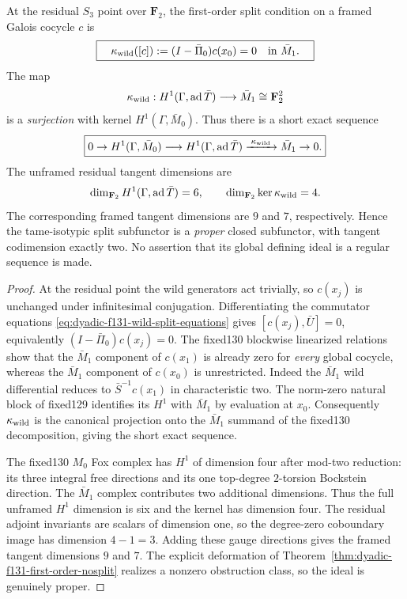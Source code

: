 \begin{corollary}
\label{cor:dyadic-f131-split-tangent-codimension}
At the residual $S_3$
point over $\mathbf F_2$,
the first-order split
condition on a framed
Galois cocycle $c$ is
\begin{equation}\label{eq:dyadic-f131-tangent-wild-character}
\boxed{\quad
\kappa_{\rm wild}([c])
:=(I-\bar\Pi_0)c(x_0)=0
\quad\text{in }\bar M_1.
\quad}
\end{equation}
The map
\[
\kappa_{\rm wild}:
H^1(\Gamma,\operatorname{ad}\bar T)
\longrightarrow\bar M_1
\cong\mathbf F_2^2
\]
is a \emph{surjection}
with kernel
$H^1(\Gamma,\bar M_0)$.
Thus there is a short
exact sequence
\begin{equation}\label{eq:dyadic-f131-tangent-exact-sequence}
\boxed{
0\to H^1(\Gamma,\bar M_0)
\longrightarrow
H^1(\Gamma,\operatorname{ad}\bar T)
\xrightarrow{\;\kappa_{\rm wild}\;}
\bar M_1\to0.
}
\end{equation}
The unframed residual
tangent dimensions are
\[
\dim_{\mathbf F_2}H^1(\Gamma,\operatorname{ad}\bar T)=6,
\qquad
\dim_{\mathbf F_2}\ker\kappa_{\rm wild}=4.
\]
The corresponding framed
tangent dimensions are
$9$ and $7$, respectively.
Hence the tame-isotypic
split subfunctor is a
\emph{proper} closed
subfunctor, with tangent
codimension exactly two.
No assertion that its
global defining ideal is
a regular sequence is made.
\end{corollary}

\begin{proof}
At the residual point
the wild generators
act trivially, so
$c(x_j)$ is unchanged
under infinitesimal
conjugation.
Differentiating the
commutator equations
\eqref{eq:dyadic-f131-wild-split-equations}
gives
$[c(x_j),\bar U]=0$,
equivalently
$(I-\bar\Pi_0)c(x_j)=0$.
The fixed130 blockwise
linearized relations show
that the $\bar M_1$
component of $c(x_1)$
is already zero for
\emph{every} global
cocycle, whereas the
$\bar M_1$ component of
$c(x_0)$ is unrestricted.
Indeed the $\bar M_1$
wild differential reduces
to $\bar S^{-1}c(x_1)$
in characteristic two.
The norm-zero natural
block of fixed129
identifies its $H^1$
with $\bar M_1$ by
evaluation at $x_0$.
Consequently
$\kappa_{\rm wild}$
is the canonical
projection onto the
$\bar M_1$ summand of
the fixed130
decomposition, giving
the short exact
sequence.

The fixed130 $M_0$
Fox complex has
$H^1$ of dimension
four after mod-two
reduction: its three
integral free directions
and its one top-degree
$2$-torsion Bockstein
direction.
The $\bar M_1$
complex contributes two
additional dimensions.
Thus the full unframed
$H^1$ dimension is six
and the kernel has
dimension four.
The residual adjoint
invariants are scalars
of dimension one, so
the degree-zero
coboundary image has
dimension $4-1=3$.
Adding these gauge
directions gives the
framed tangent
dimensions $9$ and $7$.
The explicit deformation
of
Theorem~\ref{thm:dyadic-f131-first-order-nosplit}
realizes a nonzero
obstruction class, so
the ideal is genuinely
proper.
\end{proof}

